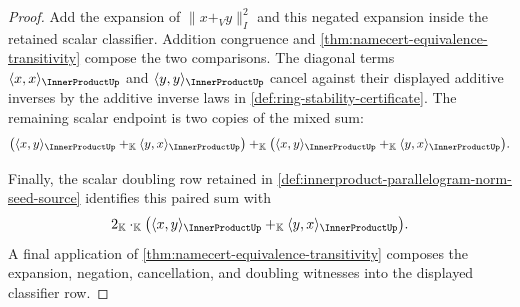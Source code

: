 \begin{proof}
Add the expansion of $\|x+_V y\|_{I}^{2}$ and this negated expansion inside the
retained scalar classifier. Addition congruence and
\autoref{thm:namecert-equivalence-transitivity} compose the two comparisons.
The diagonal terms $\langle x,x\rangle_{\InnerProductUp}$ and
$\langle y,y\rangle_{\InnerProductUp}$ cancel against their displayed additive
inverses by the additive inverse laws in
\autoref{def:ring-stability-certificate}. The remaining scalar endpoint is two
copies of the mixed sum:
$$
\bigl(
\langle x,y\rangle_{\InnerProductUp}
+_{\mathbb{K}}
\langle y,x\rangle_{\InnerProductUp}
\bigr)
+_{\mathbb{K}}
\bigl(
\langle x,y\rangle_{\InnerProductUp}
+_{\mathbb{K}}
\langle y,x\rangle_{\InnerProductUp}
\bigr).
$$

Finally, the scalar doubling row retained in
\autoref{def:innerproduct-parallelogram-norm-seed-source} identifies this
paired sum with
$$
2_{\mathbb{K}}\cdot_{\mathbb{K}}
\bigl(
\langle x,y\rangle_{\InnerProductUp}
+_{\mathbb{K}}
\langle y,x\rangle_{\InnerProductUp}
\bigr).
$$
A final application of \autoref{thm:namecert-equivalence-transitivity}
composes the expansion, negation, cancellation, and doubling witnesses into
the displayed classifier row.
\end{proof}

